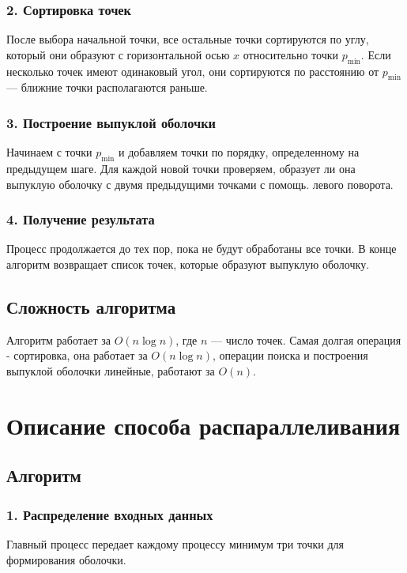 \documentclass[12pt]{article}
\begin{document}
\subsubsection*{2. Сортировка точек}
После выбора начальной точки, все остальные точки сортируются по углу, который они образуют с горизонтальной осью \(x\) относительно точки \(p_{\text{min}}\). Если несколько точек имеют одинаковый угол, они сортируются по расстоянию от \(p_{\text{min}}\) — ближние точки располагаются раньше.

\subsubsection*{3. Построение выпуклой оболочки}
Начинаем с точки \(p_{\text{min}}\) и добавляем точки по порядку, определенному на предыдущем шаге. Для каждой новой точки проверяем, образует ли она выпуклую оболочку с двумя предыдущими точками с помощь. левого поворота.

\subsubsection*{4. Получение результата}
Процесс продолжается до тех пор, пока не будут обработаны все точки. В конце алгоритм возвращает список точек, которые образуют выпуклую оболочку.


\subsection*{Сложность алгоритма}

Алгоритм работает за \(O(n \log n)\), где $n$ — число точек. Самая долгая операция - сортировка, она работает за \(O(n \log n)\), операции поиска и построения выпуклой оболочки линейные, работают за \(O(n)\).

\section{Описание способа распараллеливания}

\subsection*{Алгоритм}

\subsubsection*{1. Распределение входных данных}
Главный процесс передает каждому процессу минимум три точки для формирования оболочки.
\end{document}
